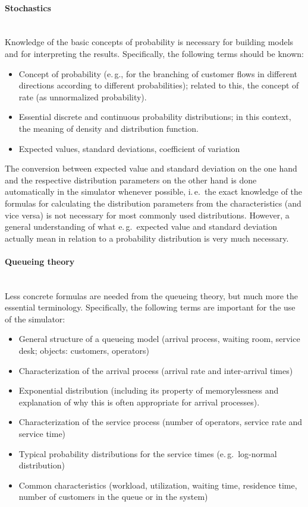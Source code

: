 \documentclass{svmono}
\begin{document}
\paragraph{Stochastics}~\\
Knowledge of the basic concepts of probability is necessary for building models and for interpreting the results. Specifically, the following terms should be known:

\begin{itemize}
\item
Concept of probability (e.\,g., for the branching of customer flows in different directions according to different probabilities); related to this, the concept of rate (as unnormalized probability).
\item
Essential discrete and continuous probability distributions; in this context, the meaning of density and distribution function.
\item
Expected values, standard deviations, coefficient of variation
\end{itemize}

The conversion between expected value and standard deviation on the one hand and the respective distribution parameters on the other hand is done automatically in the simulator whenever possible, i.\,e.\ the exact knowledge of the formulas for calculating the distribution parameters from the characteristics (and vice versa) is not necessary for most commonly used distributions. However, a general understanding of what e.\,g.\ expected value and standard deviation actually mean in relation to a probability distribution is very much necessary.

\paragraph{Queueing theory}~\\
Less concrete formulas are needed from the queueing theory, but much more the essential terminology. Specifically, the following terms are important for the use of the simulator:

\begin{itemize}
\item
General structure of a queueing model (arrival process, waiting room, service desk; objects: customers, operators)
\item
Characterization of the arrival process (arrival rate and inter-arrival times)
\item
Exponential distribution (including its property of memorylessness and explanation of why this is often appropriate for arrival processes).
\item
Characterization of the service process (number of operators, service rate and service time)
\item
Typical probability distributions for the service times (e.\,g.\ log-normal distribution)
\item
Common characteristics (workload, utilization, waiting time, residence time, number of customers in the queue or in the system)
\end{itemize}
\end{document}
